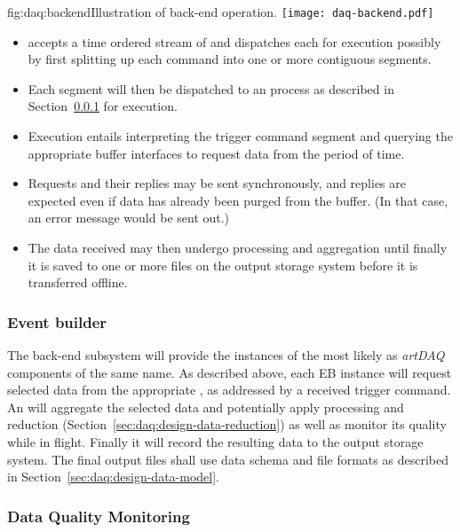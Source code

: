 \begin{dunefigure}{fig:daq:backend}{Illustration of   back-end operation.}
  \texttt{[image: daq-backend.pdf]}
\end{dunefigure}

\begin{itemize}
\item {} accepts a time ordered stream of  and
  dispatches each for execution possibly by first splitting up each command into
  one or more contiguous segments.
\item Each segment will then be dispatched to an  process as described
  in Section~\ref{sec:daq:design-event-builder} for execution.
\item Execution entails interpreting the trigger command segment and querying
  the appropriate  buffer interfaces to request data from the period
  of time. 
\item Requests and their replies may be sent synchronously, and replies are
  expected even if data has already been purged from the  buffer.
  (In that case, an error message would be sent out.)
\item The data received may then undergo processing and aggregation
  until finally it is saved to one or more files on the output storage
  system before it is transferred offline.
\end{itemize}


\subsubsection{Event builder}
\label{sec:daq:design-event-builder}

The  back-end subsystem will provide the instances of the 
most likely as \textit{artDAQ}~\cite{artdaq} components of the same name.
As described above, each EB instance will request selected data from the
appropriate , as addressed by a received trigger command. 
An  will aggregate the selected data and potentially apply processing
and reduction (Section~\ref{sec:daq:design-data-reduction}) as well as monitor
its quality while in flight.
Finally it will record the resulting data to the output storage system.
The final output files shall use data schema and file formats as described in
Section~\ref{sec:daq:design-data-model}.


\subsubsection{Data Quality Monitoring}
\label{sec:daq:design-data-quality}

